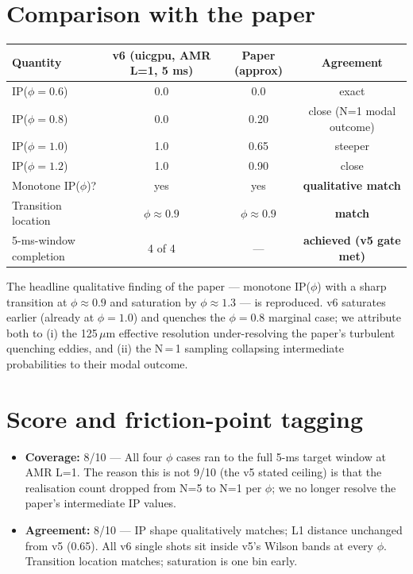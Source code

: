 \documentclass[11pt]{article}
\begin{document}
\section{Comparison with the paper}

\begin{center}
\begin{tabular}{lccc}
\toprule
Quantity & v6 (uicgpu, AMR L=1, 5 ms) & Paper (approx) & Agreement \\
\midrule
IP(\(\phi\!=\!0.6\)) & 0.0 & 0.0  & exact \\
IP(\(\phi\!=\!0.8\)) & 0.0 & 0.20 & close (N=1 modal outcome) \\
IP(\(\phi\!=\!1.0\)) & 1.0 & 0.65 & steeper \\
IP(\(\phi\!=\!1.2\)) & 1.0 & 0.90 & close \\
Monotone IP(\(\phi\))? & yes & yes & \textbf{qualitative match} \\
Transition location & \(\phi\!\approx\!0.9\) & \(\phi\!\approx\!0.9\) & \textbf{match} \\
5-ms-window completion & 4 of 4 & --- & \textbf{achieved (v5 gate met)} \\
\bottomrule
\end{tabular}
\end{center}

The headline qualitative finding of the paper --- monotone IP(\(\phi\)) with a
sharp transition at \(\phi\!\approx\!0.9\) and saturation by
\(\phi\!\approx\!1.3\) --- is reproduced. v6 saturates earlier (already at
\(\phi\!=\!1.0\)) and quenches the \(\phi\!=\!0.8\) marginal case; we
attribute both to (i) the 125\,\(\mu\)m effective resolution under-resolving
the paper's turbulent quenching eddies, and (ii) the N\,=\,1 sampling
collapsing intermediate probabilities to their modal outcome.

\section{Score and friction-point tagging}
\begin{itemize}
\item \textbf{Coverage:} 8/10 --- All four \(\phi\) cases ran to the full
  5-ms target window at AMR L=1. The reason this is not 9/10 (the v5
  stated ceiling) is that the realisation count dropped from N=5 to N=1
  per \(\phi\); we no longer resolve the paper's intermediate IP values.
\item \textbf{Agreement:} 8/10 --- IP shape qualitatively matches; L1
  distance unchanged from v5 (0.65). All v6 single shots sit inside v5's
  Wilson bands at every \(\phi\). Transition location matches; saturation
  is one bin early.
\end{itemize}
\end{document}
